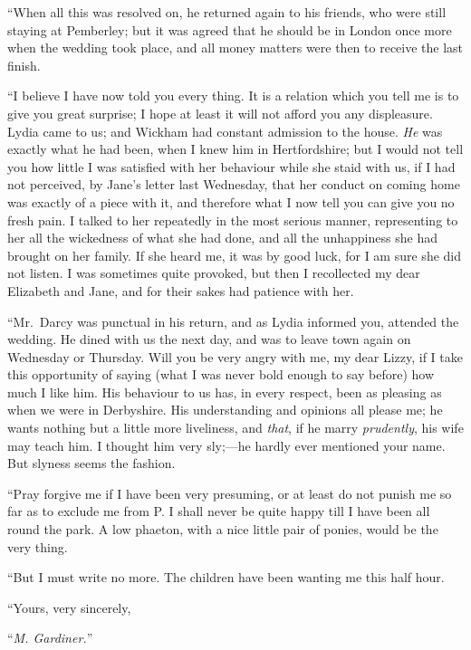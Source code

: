 ``When all this was resolved on, he returned again to his friends, who
were still staying at Pemberley; but it was agreed that he should be
in London once more when the wedding took place, and all money matters
were then to receive the last finish.

``I believe I have now told you every thing.  It is a relation which you
tell me is to give you great surprise; I hope at least it will not
afford you any displeasure.  Lydia came to us; and Wickham had
constant admission to the house.  \emph{He} was exactly what he had been,
when I knew him in Hertfordshire; but I would not tell you how little
I was satisfied with her behaviour while she staid with us, if I had
not perceived, by Jane's letter last Wednesday, that her conduct on
coming home was exactly of a piece with it, and therefore what I now
tell you can give you no fresh pain.  I talked to her repeatedly in
the most serious manner, representing to her all the wickedness of
what she had done, and all the unhappiness she had brought on her
family.  If she heard me, it was by good luck, for I am sure she did
not listen.  I was sometimes quite provoked, but then I recollected my
dear Elizabeth and Jane, and for their sakes had patience with her.

``Mr.\ Darcy was punctual in his return, and as Lydia informed you,
attended the wedding.  He dined with us the next day, and was to leave
town again on Wednesday or Thursday.  Will you be very angry with me,
my dear Lizzy, if I take this opportunity of saying (what I was never
bold enough to say before) how much I like him.  His behaviour to us
has, in every respect, been as pleasing as when we were in Derbyshire.
His understanding and opinions all please me; he wants nothing but a
little more liveliness, and \emph{that}, if he marry \emph{prudently}, his wife may
teach him.  I thought him very sly;---he hardly ever mentioned your
name.  But slyness seems the fashion.

``Pray forgive me if I have been very presuming, or at least do not
punish me so far as to exclude me from P.  I shall never be quite
happy till I have been all round the park.  A low phaeton, with a nice
little pair of ponies, would be the very thing.

``But I must write no more.  The children have been wanting me this half
hour.

``Yours, very sincerely,

\medskip
``\emph{M. Gardiner.}''
\bigskip

